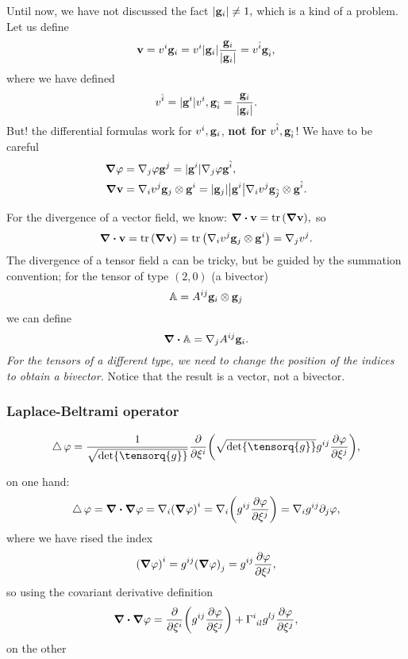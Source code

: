 \documentclass[../main.tex]{subfiles}
\begin{document}
Until now, we have not discussed the fact $|\vb{g}_i| \neq 1,$ which is a kind of a problem. Let us define
\[
	\vb{v}=v^i \vb{g}_i = v^i |\vb{g}_i| \frac{\vb{g}_i}{|\vb{g}_i|} = v^{\hat{i}} \vb{g}_{\hat{i}},
\]
where we have defined
\[
	v^{\hat{i}} = |\vb{g}^i| v^i, \vb{g}_{\hat{i}} = \frac{\vb{g}_i}{|\vb{g}_i|}.
\]
But! the differential formulas work for $v^i, \vb{g}_i$, \textbf{not for} $v^{\hat{i}}, \vb{g}_{\hat{i}}$! We have to be careful
\begin{align}
	\grad \varphi &= \nabla_j \varphi \vb{g}^j = |\vb{g}^i|\nabla_j \varphi \vb{g}^{\hat{i}},\\
	\grad \vb{v} &= \nabla_i v^j \vb{g}_j \otimes \vb{g}^i = \abs{\vb{g}_j} \abs{\vb{g}^i} \nabla_i v^j \vb{g}_{\hat{j}} \otimes \vb{g}^{\hat{i}}.
\end{align}

For the divergence of a vector field, we know: $\divergence{\vb{v}} = \trace\qty(\grad \vb{v}),$ so 
\[
	\divergence{\vb{v}} = \tr\qty(\grad \vb{v}) = \tr\qty(\nabla_i v^j \vb{g}_j \otimes \vb{g}^i) = \nabla_j v^j.
\]
The divergence of a tensor field a can be tricky, but be guided by the summation convention; for the tensor of type $(2,0)$ (a bivector)
\[
	\mathbb{A} = A^{ij}\vb{g}_i \otimes \vb{g}_j
\]
we can define
\[
	\divergence{\tensorq{A}} = \nabla_j A^{ij} \vb{g}_i.
\]
\textit{For the tensors of a different type, we need to change the position of the indices to obtain a bivector.} Notice that the result is a vector, not a bivector.

\subsubsection{Laplace-Beltrami operator}
\label{sec:laplace_beltrami}

\[
	\laplace \varphi = \frac{1}{\sqrt{\det \tensorq{g}}}\pdv{\xi^i}\qty(\sqrt{\det \tensorq{g}} g^{ij} \pdv{\varphi}{\xi^j}),
\]

on one hand:
\begin{equation*}
	\laplace \varphi = \divergence{\grad \varphi}= \nabla_i \qty(\grad \varphi)^i = \nabla_i \qty(g^{ij}\pdv{\varphi}{\xi^j}) = \nabla_i g^{ij}\partial_{j}\varphi,
\end{equation*}
where we have rised the index
\[
	\qty(\grad \varphi)^i = g^{ij}\qty(\grad \varphi)_j = g^{ij} \pdv{\varphi}{\xi^j},
\]
so using the covariant derivative definition
\[
	\divergence{\grad \varphi} = \pdv{\xi^i}\qty(g^{ij}\pdv{\varphi}{\xi^j})+ \Gamma \indices{^i_{il}} g^{lj} \pdv{\varphi}{\xi^j},
\]
on the other
\end{document}
